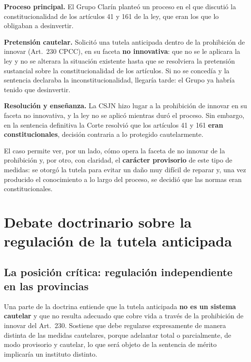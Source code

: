 \documentclass[12pt,oneside]{book}
\begin{document}
\textbf{Proceso principal.} El Grupo Clarín planteó un proceso en el que discutió la constitucionalidad de los artículos 41 y 161 de la ley, que eran los que lo obligaban a desinvertir.

\textbf{Pretensión cautelar.} Solicitó una tutela anticipada dentro de la prohibición de innovar (Art.~230 CPCC), en su faceta \textbf{no innovativa}: que no se le aplicara la ley y no se alterara la situación existente hasta que se resolviera la pretensión sustancial sobre la constitucionalidad de los artículos. Si no se concedía y la sentencia declaraba la inconstitucionalidad, llegaría tarde: el Grupo ya habría tenido que desinvertir.

\textbf{Resolución y enseñanza.} La CSJN hizo lugar a la prohibición de innovar en su faceta no innovativa, y la ley no se aplicó mientras duró el proceso. Sin embargo, en la sentencia definitiva la Corte resolvió que los artículos 41 y 161 \textbf{eran constitucionales}, decisión contraria a lo protegido cautelarmente.

El caso permite ver, por un lado, cómo opera la faceta de no innovar de la prohibición y, por otro, con claridad, el \textbf{carácter provisorio} de este tipo de medidas: se otorgó la tutela para evitar un daño muy difícil de reparar y, una vez producido el conocimiento a lo largo del proceso, se decidió que las normas eran constitucionales.

\section{Debate doctrinario sobre la regulación de la tutela anticipada}

\subsection{La posición crítica: regulación independiente en las provincias}

Una parte de la doctrina entiende que la tutela anticipada \textbf{no es un sistema cautelar} y que no resulta adecuado que cobre vida a través de la prohibición de innovar del Art.~230. Sostiene que debe regularse expresamente de manera distinta de las medidas cautelares, porque adelantar total o parcialmente, de modo provisorio y cautelar, lo que será objeto de la sentencia de mérito implicaría un instituto distinto.
\end{document}
